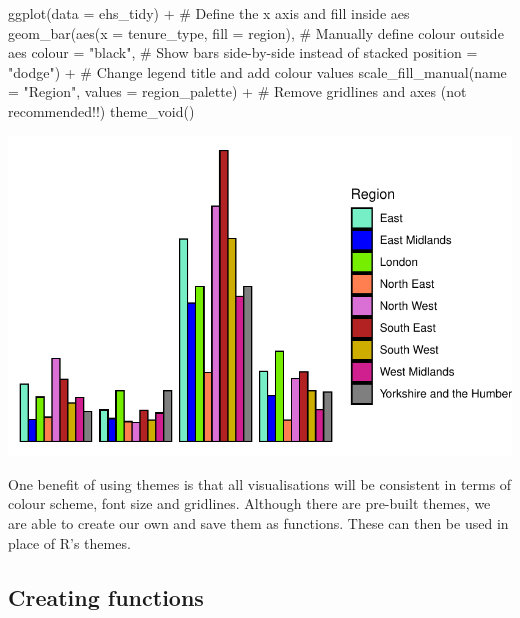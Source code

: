 \documentclass[
  letterpaper,
  DIV=11,
  numbers=noendperiod]{scrreprt}
\newenvironment{Shaded}{\begin{snugshade}}{\end{snugshade}}
\newcommand{\AttributeTok}[1]{\textcolor[rgb]{0.40,0.45,0.13}{#1}}
\newcommand{\CommentTok}[1]{\textcolor[rgb]{0.37,0.37,0.37}{#1}}
\newcommand{\FunctionTok}[1]{\textcolor[rgb]{0.28,0.35,0.67}{#1}}
\newcommand{\NormalTok}[1]{\textcolor[rgb]{0.00,0.23,0.31}{#1}}
\newcommand{\SpecialCharTok}[1]{\textcolor[rgb]{0.37,0.37,0.37}{#1}}
\newcommand{\StringTok}[1]{\textcolor[rgb]{0.13,0.47,0.30}{#1}}
\begin{document}
\begin{Shaded}
\begin{Highlighting}[]
\FunctionTok{ggplot}\NormalTok{(}\AttributeTok{data =}\NormalTok{ ehs\_tidy) }\SpecialCharTok{+} 
  \CommentTok{\# Define the x axis and fill inside aes}
  \FunctionTok{geom\_bar}\NormalTok{(}\FunctionTok{aes}\NormalTok{(}\AttributeTok{x =}\NormalTok{ tenure\_type, }\AttributeTok{fill =}\NormalTok{ region),}
           \CommentTok{\# Manually define colour outside aes}
           \AttributeTok{colour =} \StringTok{"black"}\NormalTok{,}
           \CommentTok{\# Show bars side{-}by{-}side instead of stacked}
           \AttributeTok{position =} \StringTok{"dodge"}\NormalTok{) }\SpecialCharTok{+}
  \CommentTok{\# Change legend title and add colour values}
  \FunctionTok{scale\_fill\_manual}\NormalTok{(}\AttributeTok{name =} \StringTok{"Region"}\NormalTok{, }\AttributeTok{values =}\NormalTok{ region\_palette) }\SpecialCharTok{+} 
  \CommentTok{\# Remove gridlines and axes (not recommended!!)}
  \FunctionTok{theme\_void}\NormalTok{()}
\end{Highlighting}
\end{Shaded}

\includegraphics{visualisation_files/figure-pdf/side by side bar theme_light-1.pdf}

One benefit of using themes is that all visualisations will be
consistent in terms of colour scheme, font size and gridlines. Although
there are pre-built themes, we are able to create our own and save them
as functions. These can then be used in place of R's themes.

\subsection{Creating functions}\label{creating-functions}
\end{document}
